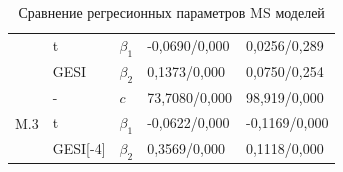 \documentclass[a4paper,14pt]{extreport}
\begin{document}
\begin{table}[H]
\begin{tabular}{l|ll|ll}
		                                                      & t                                                        & $\beta_1$                                               & -0,0690/0,000                                        & 0,0256/0,289                      \\
		                                                      & GESI                                                     & $\beta_2$                                               & 0,1373/0,000                                         & 0,0750/0,254                      \\ \hline
		\multirow{3}{*}{M.3}                                  & -                                                        & $c$                                                     & 73,7080/0,000                                        & 98,919/0,000                      \\
		                                                      & t                                                        & $\beta_1$                                               & -0,0622/0,000                                        & -0,1169/0,000                     \\
		                                                      & GESI[-4]                                                 & $\beta_2$                                               & 0,3569/0,000                                         & 0,1118/0,000                      \\ \hline
	\end{tabular}
	\caption{Сравнение регресионных параметров MS моделей}
	\label{tbl:ggdp_model_params_reg}
\end{table}
\end{document}
